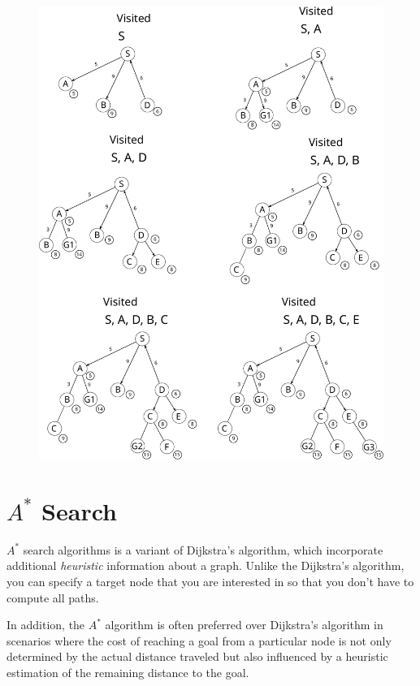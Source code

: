 \begin{figure}[h]
	\centering
	\includegraphics[scale=0.6]{./images/search_alg/uniform_cost_search.pdf}
\end{figure}

\newpage
\section{$A^*$ Search}
$A^*$ search algorithms is a variant of Dijkstra's algorithm, which incorporate additional \textit{heuristic} information about a graph. Unlike the Dijkstra's algorithm, you can specify a target node that you are interested in so that you don't have to compute all paths. 

In addition, the $A^*$ algorithm is often preferred over Dijkstra's algorithm in scenarios where the cost of reaching a goal from a particular node is not only determined by the actual distance traveled but also influenced by a heuristic estimation of the remaining distance to the goal. 

